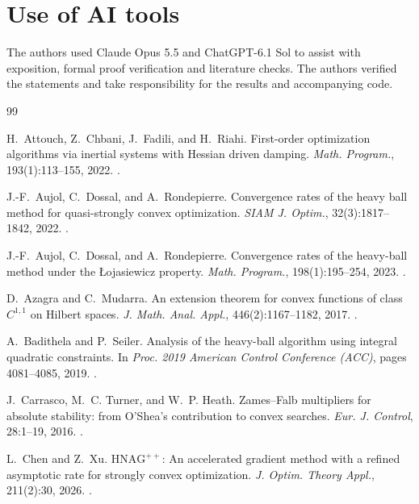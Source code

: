 \documentclass[11pt]{article}
\theoremstyle{definition}
\theoremstyle{remark}
\begin{document}
\section*{Use of AI tools}
The authors used Claude Opus 5.5 and ChatGPT-6.1 Sol
to assist with exposition, formal proof verification and literature checks.
The authors verified the statements and take responsibility for the results
and accompanying code.

\begin{thebibliography}{99}
\raggedright

 H.~Attouch, Z.~Chbani, J.~Fadili, and H.~Riahi. First-order optimization algorithms via inertial systems with Hessian driven damping. \textit{Math. Program.}, 193(1):113--155, 2022. .

 J.-F.~Aujol, C.~Dossal, and A.~Rondepierre. Convergence rates of the heavy ball method for quasi-strongly convex optimization. \textit{SIAM J. Optim.}, 32(3):1817--1842, 2022. .

 J.-F.~Aujol, C.~Dossal, and A.~Rondepierre. Convergence rates of the heavy-ball method under the {\L}ojasiewicz property. \textit{Math. Program.}, 198(1):195--254, 2023. .

 D.~Azagra and C.~Mudarra. An extension theorem for convex functions of class \(C^{1,1}\) on Hilbert spaces. \textit{J. Math. Anal. Appl.}, 446(2):1167--1182, 2017. .

 A.~Badithela and P.~Seiler. Analysis of the heavy-ball algorithm using integral quadratic constraints. In \textit{Proc. 2019 American Control Conference (ACC)}, pages 4081--4085, 2019. .

 J.~Carrasco, M.~C. Turner, and W.~P. Heath. Zames--Falb multipliers for absolute stability: from O'Shea's contribution to convex searches. \textit{Eur. J. Control}, 28:1--19, 2016. .

 L.~Chen and Z.~Xu. \(\mathrm{HNAG}^{++}\): An accelerated gradient method with a refined asymptotic rate for strongly convex optimization. \textit{J. Optim. Theory Appl.}, 211(2):30, 2026. .


\end{thebibliography}
\end{document}
